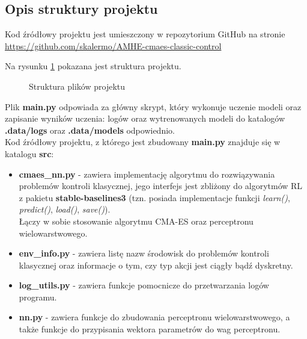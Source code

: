\documentclass[12pt,a4paper]{article}
\begin{document}
\subsection{Opis struktury projektu}

Kod źródłowy projektu jest umieszczony w repozytorium GitHub na stronie
\href{https://github.com/skalermo/AMHE-cmaes-classic-control}
{https://github.com/skalermo/AMHE-cmaes-classic-control}
\medskip

Na rysunku \ref{fig:dirtree} pokazana jest struktura projektu.

\begin{figure}[!ht]
  \caption{Struktura plików projektu}
  \label{fig:dirtree}
\end{figure}

Plik \textbf{main.py} odpowiada za główny skrypt, który wykonuje uczenie
modeli oraz zapisanie wyników uczenia: logów oraz wytrenowanych modeli
do katalogów \textbf{.data/logs} oraz \textbf{.data/models} odpowiednio. \\

Kod źródłowy projektu, z którego jest zbudowany \textbf{main.py} znajduje się
w katalogu \textbf{src}:
\begin{itemize}
  \item \textbf{cmaes\_nn.py} - zawiera implementację algorytmu do rozwiązywania
        problemów kontroli klasycznej, jego interfejs jest zbliżony
        do algorytmów RL z pakietu \textbf{stable-baselines3}
        (tzn. posiada implementacje funkcji \emph{learn()}, \emph{predict()},
        \emph{load()}, \emph{save()}). \\
        Łączy w sobie stosowanie algorytmu CMA-ES oraz perceptronu wielowarstwowego.

  \item \textbf{env\_info.py} - zawiera listę nazw środowisk do problemów kontroli
        klasycznej oraz informacje o tym, czy typ akcji jest ciągły bądź dyskretny.

  \item \textbf{log\_utils.py} - zawiera funkcje pomocnicze do przetwarzania
        logów programu.

  \item \textbf{nn.py} - zawiera funkcje do zbudowania perceptronu
        wielowarstwowego, a także funkcje do przypisania wektora parametrów
        do wag perceptronu.
\end{itemize}
\end{document}
